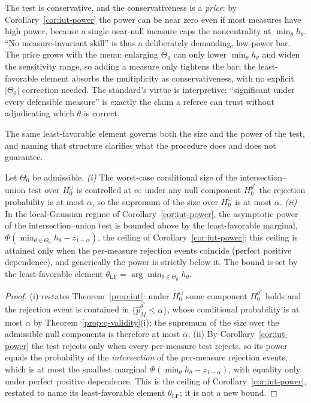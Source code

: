 \documentclass[risks,article,submit,pdftex,oneauthor]{Definitions/mdpi}
\begin{document}
The test is conservative, and the conservativeness is a \emph{price}: by
Corollary~\ref{cor:iut-power} the power can be near zero even if most measures have
high power, because a single near-null measure caps the noncentrality at
$\min_\theta h_\theta$. ``No measure-invariant skill'' is thus a deliberately
demanding, low-power bar. The price grows with the menu: enlarging $\Theta_0$ can
only lower $\min_\theta h_\theta$ and widen the sensitivity range, so adding a
measure only tightens the bar; the least-favorable element absorbs the multiplicity
as conservativeness, with no explicit $|\Theta_0|$ correction needed. The
standard's virtue is interpretive: ``significant under every defensible measure''
is exactly the claim a referee can trust without adjudicating which $\theta$ is
correct.

The same least-favorable element governs both the size and the power of the test,
and naming that structure clarifies what the procedure does and does not guarantee.

\begin{Proposition}
\label{prop:minimax}
Let $\Theta_0$ be admissible.
\emph{(i)} The worst-case conditional size of the intersection--union test over
$H_0^{\cup}$ is controlled at $\alpha$: under any null component $H_0^{\theta^\ast}$
the rejection probability is at most $\alpha$, so the supremum of the size over
$H_0^{\cup}$ is at most $\alpha$.
\emph{(ii)} In the local-Gaussian regime of Corollary~\ref{cor:iut-power}, the
asymptotic power of the intersection--union test is bounded above by the
least-favorable marginal,
$\Phi(\min_{\theta\in\Theta_0}h_\theta-z_{1-\alpha})$, the ceiling of
Corollary~\ref{cor:iut-power}; this ceiling is attained only when the per-measure
rejection events coincide (perfect positive dependence), and generically the power
is strictly below it. The bound is set by the least-favorable element
$\theta_{\mathrm{LF}}=\arg\min_{\theta\in\Theta_0}h_\theta$.
\end{Proposition}

\begin{proof}
(i) restates Theorem~\ref{prop:iut}: under $H_0^{\cup}$ some component
$H_0^{\theta^\ast}$ holds and the rejection event is contained in
$\{\hat p_M^{\theta^\ast}\le\alpha\}$, whose conditional probability is at most
$\alpha$ by Theorem~\ref{prop:q-validity}(i); the supremum of the size over the
admissible null components is therefore at most $\alpha$. (ii) By
Corollary~\ref{cor:iut-power} the test rejects only when every per-measure test
rejects, so its power equals the probability of the \emph{intersection} of the
per-measure rejection events, which is at most the smallest marginal
$\Phi(\min_\theta h_\theta-z_{1-\alpha})$, with equality only under perfect
positive dependence. This is the ceiling of Corollary~\ref{cor:iut-power}, restated
to name its least-favorable element $\theta_{\mathrm{LF}}$; it is not a new bound.
\end{proof}
\end{document}
